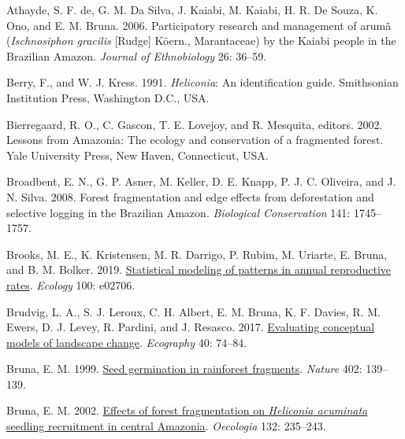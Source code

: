 \documentclass[
  12pt,
  man, donotrepeattitle,floatsintext]{apa6}
\newlength{\cslhangindent}
\newlength{\cslentryspacingunit} %
\newenvironment{CSLReferences}[2] %
 {%
  \setlength{\parindent}{0pt}
  \ifodd #1
  \let\oldpar\par
  \def\par{\hangindent=\cslhangindent\oldpar}
  \fi
  \setlength{\parskip}{#2\cslentryspacingunit}
 }%
 {}
\begin{document}
\hypertarget{refs}{}
\begin{CSLReferences}{1}{0}
\leavevmode{}%
Athayde, S. F. de, G. M. Da Silva, J. Kaiabi, M. Kaiabi, H. R. De Souza, K. Ono, and E. M. Bruna. 2006. Participatory research and management of arumã (\emph{{Ischnosiphon} gracilis} {[}{Rudge}{]} {Köern}., {Marantaceae}) by the {Kaiabi} people in the {Brazilian} {Amazon}. \emph{Journal of Ethnobiology} 26: 36--59.

\leavevmode{}%
Berry, F., and W. J. Kress. 1991. \emph{Heliconia}: An identification guide. Smithsonian Institution Press, Washington D.C., USA.

\leavevmode{}%
Bierregaard, R. O., C. Gascon, T. E. Lovejoy, and R. Mesquita, editors. 2002. Lessons from {Amazonia}: The ecology and conservation of a fragmented forest. Yale University Press, New Haven, Connecticut, USA.

\leavevmode{}%
Broadbent, E. N., G. P. Asner, M. Keller, D. E. Knapp, P. J. C. Oliveira, and J. N. Silva. 2008. Forest fragmentation and edge effects from deforestation and selective logging in the {Brazilian} {Amazon}. \emph{Biological Conservation} 141: 1745--1757.

\leavevmode{}%
Brooks, M. E., K. Kristensen, M. R. Darrigo, P. Rubim, M. Uriarte, E. Bruna, and B. M. Bolker. 2019. \href{https://doi.org/10.1002/ecy.2706}{Statistical modeling of patterns in annual reproductive rates}. \emph{Ecology} 100: e02706.

\leavevmode{}%
Brudvig, L. A., S. J. Leroux, C. H. Albert, E. M. Bruna, K. F. Davies, R. M. Ewers, D. J. Levey, R. Pardini, and J. Resasco. 2017. \href{https://doi.org/10.1111/ecog.02543}{Evaluating conceptual models of landscape change}. \emph{Ecography} 40: 74--84.

\leavevmode{}%
Bruna, E. M. 1999. \href{https://doi.org/10.1038/45963}{Seed germination in rainforest fragments}. \emph{Nature} 402: 139--139.

\leavevmode{}%
Bruna, E. M. 2002. \href{https://doi.org/10.1007/s00442-002-0956-y}{Effects of forest fragmentation on \emph{{Heliconia} acuminata} seedling recruitment in central {Amazonia}}. \emph{Oecologia} 132: 235--243.


\end{CSLReferences}
\end{document}
